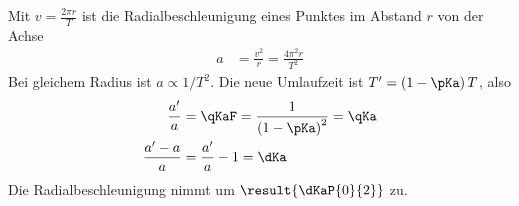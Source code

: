 Mit $v = \frac{2\pi r}{T}$ ist die Radialbeschleunigung eines Punktes im Abstand $r$ von der Achse
\begin{align}
 a &= \frac{v^2}{r} = \frac{4\pi^2 r}{T^2}
\end{align}
Bei gleichem Radius ist $a \propto 1/T^2$. Die neue Umlaufzeit ist $T' = \left(1-\pKa\right)T$, also
\begin{align}
 \frac{a'}{a} &= \qKaF = \frac{1}{\left(1-\pKa\right)^2} = \qKa \\
 \frac{a'-a}{a} &= \frac{a'}{a}-1 = \dKa
\end{align}
Die Radialbeschleunigung nimmt um $\result{\dKaP{0}{2}}$ zu.
